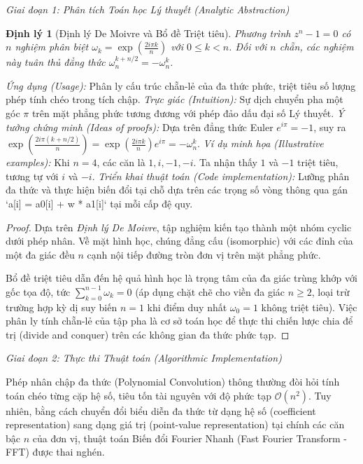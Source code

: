 \documentclass{article}
\newtheorem{dinhly}{Định lý}
\begin{document}
\vspace{0.5em}\noindent\emph{Giai đoạn 1: Phân tích Toán học Lý thuyết (Analytic Abstraction)}

\begin{dinhly}[Định lý De Moivre và Bổ đề Triệt tiêu]
Phương trình $z^n - 1 = 0$ có $n$ nghiệm phân biệt $\omega_k = \exp\left(\frac{2i\pi k}{n}\right)$ với $0 \le k < n$. Đối với $n$ chẵn, các nghiệm này tuân thủ đẳng thức $\omega_n^{k + n/2} = -\omega_n^k$.
\end{dinhly}
\emph{Ứng dụng (Usage):} Phân ly cấu trúc chẵn-lẻ của đa thức phức, triệt tiêu số lượng phép tính chéo trong tích chập.
\emph{Trực giác (Intuition):} Sự dịch chuyển pha một góc $\pi$ trên mặt phẳng phức tương đương với phép đảo dấu đại số Lý thuyết.
\emph{Ý tưởng chứng minh (Ideas of proofs):} Dựa trên đẳng thức Euler $e^{i\pi} = -1$, suy ra $\exp\left(\frac{2i\pi (k + n/2)}{n}\right) = \exp\left(\frac{2i\pi k}{n}\right) e^{i\pi} = -\omega_n^k$.
\emph{Ví dụ minh họa (Illustrative examples):} Khi $n=4$, các căn là $1, i, -1, -i$. Ta nhận thấy $1$ và $-1$ triệt tiêu, tương tự với $i$ và $-i$.
\emph{Triển khai thuật toán (Code implementation):} Lưỡng phân đa thức và thực hiện biến đổi tại chỗ dựa trên các trọng số vòng thông qua gán `a[i] = a0[i] + w * a1[i]` tại mỗi cấp đệ quy.

\begin{proof}
Dựa trên \emph{Định lý De Moivre}, tập nghiệm kiến tạo thành một nhóm cyclic dưới phép nhân. Về mặt hình học, chúng đẳng cấu (isomorphic) với các đỉnh của một đa giác đều $n$ cạnh nội tiếp đường tròn đơn vị trên mặt phẳng phức.

Bổ đề triệt tiêu dẫn đến hệ quả hình học là trọng tâm của đa giác trùng khớp với gốc tọa độ, tức $\sum_{k=0}^{n-1} \omega_k = 0$ (áp dụng chặt chẽ cho viền đa giác $n \ge 2$, loại trừ trường hợp kỳ dị suy biến $n=1$ khi điểm duy nhất $\omega_0=1$ không triệt tiêu). Việc phân ly tính chẵn-lẻ của tập pha là cơ sở toán học để thực thi chiến lược chia để trị (divide and conquer) trên các không gian đa thức phức tạp.
\end{proof}

\vspace{0.5em}\noindent\emph{Giai đoạn 2: Thực thi Thuật toán (Algorithmic Implementation)}

Phép nhân chập đa thức (Polynomial Convolution) thông thường đòi hỏi tính toán chéo từng cặp hệ số, tiêu tốn tài nguyên với độ phức tạp $\mathcal{O}(n^2)$. Tuy nhiên, bằng cách chuyển đổi biểu diễn đa thức từ dạng hệ số (coefficient representation) sang dạng giá trị (point-value representation) tại chính các căn bậc $n$ của đơn vị, thuật toán Biến đổi Fourier Nhanh (Fast Fourier Transform - FFT) được thai nghén.
\end{document}
